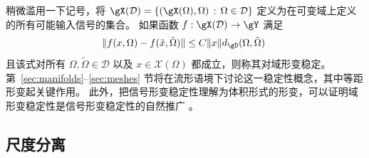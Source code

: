 
稍微滥用一下记号，将 $\gX(\mathcal{D}) = \{ (\gX(\Omega), \Omega) \, : \, \Omega \in \mathcal{D} \}$ 定义为在可变域上定义的所有可能输入信号的集合。
如果函数 $f : \gX(\mathcal{D}) \to \gY$ 满足
\begin{equation}
\| f( x, \Omega) - f(\tilde{x}, \tilde{\Omega}) \| \leq C \|x \| d_{\gD}(\Omega, \tilde{\Omega})~
\label{eqn:domain_def_stability}
\end{equation}
%
且该式对所有 $\Omega, \tilde{\Omega} \in \mathcal{D}$ 以及 $x \in \mathcal{X}(\Omega)$ 都成立，则称其对域形变稳定。
%
第~\ref{sec:manifolds}--\ref{sec:meshes} 节将在流形语境下讨论这一稳定性概念，其中等距形变起关键作用。
此外，把信号形变稳定性理解为体积形式的形变，可以证明域形变稳定性是信号形变稳定性的自然推广 \cite{gama2019diffusion}。





\subsection{尺度分离}
\label{sec:scale_separation}

